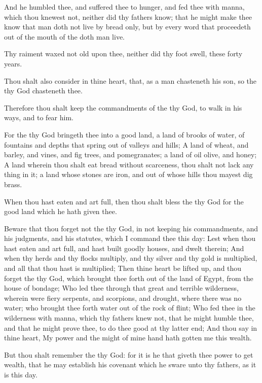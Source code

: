 \verse And he humbled thee, and suffered thee to hunger, and fed thee with manna, which thou knewest not, neither did thy fathers know; that he might make thee know that man doth not live by bread only, but by every word that proceedeth out of the mouth of the \LORD doth man live.

\verse Thy raiment waxed not old upon thee, neither did thy foot swell, these forty years.

\verse Thou shalt also consider in thine heart, that, as a man chasteneth his son, so the \LORD thy God chasteneth thee.

\verse Therefore thou shalt keep the commandments of the \LORD thy God, to walk in his ways, and to fear him.

\verse For the \LORD thy God bringeth thee into a good land, a land of brooks of water, of fountains and depths that spring out of valleys and hills; \verse A land of wheat, and barley, and vines, and fig trees, and pomegranates; a land of oil olive, and honey; \verse A land wherein thou shalt eat bread without scarceness, thou shalt not lack any thing in it; a land whose stones are iron, and out of whose hills thou mayest dig brass.

\verse When thou hast eaten and art full, then thou shalt bless the \LORD thy God for the good land which he hath given thee.

\verse Beware that thou forget not the \LORD thy God, in not keeping his commandments, and his judgments, and his statutes, which I command thee this day: \verse Lest when thou hast eaten and art full, and hast built goodly houses, and dwelt therein; \verse And when thy herds and thy flocks multiply, and thy silver and thy gold is multiplied, and all that thou hast is multiplied; \verse Then thine heart be lifted up, and thou forget the \LORD thy God, which brought thee forth out of the land of Egypt, from the house of bondage; \verse Who led thee through that great and terrible wilderness, wherein were fiery serpents, and scorpions, and drought, where there was no water; who brought thee forth water out of the rock of flint; \verse Who fed thee in the wilderness with manna, which thy fathers knew not, that he might humble thee, and that he might prove thee, to do thee good at thy latter end; \verse And thou say in thine heart, My power and the might of mine hand hath gotten me this wealth.

\verse But thou shalt remember the \LORD thy God: for it is he that giveth thee power to get wealth, that he may establish his covenant which he sware unto thy fathers, as it is this day.

